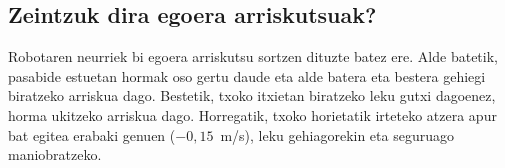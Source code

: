 \subsection{Zeintzuk dira egoera arriskutsuak?}\label{sec:oz-arriskuak}

Robotaren neurriek bi egoera arriskutsu sortzen dituzte batez ere. Alde batetik, pasabide estuetan hormak oso gertu daude eta alde batera eta bestera gehiegi biratzeko arriskua dago. Bestetik, txoko itxietan biratzeko leku gutxi dagoenez, horma ukitzeko arriskua dago. Horregatik, txoko horietatik irteteko atzera apur bat egitea erabaki genuen ($-0{,}15$~m/s), leku gehiagorekin eta seguruago maniobratzeko.
